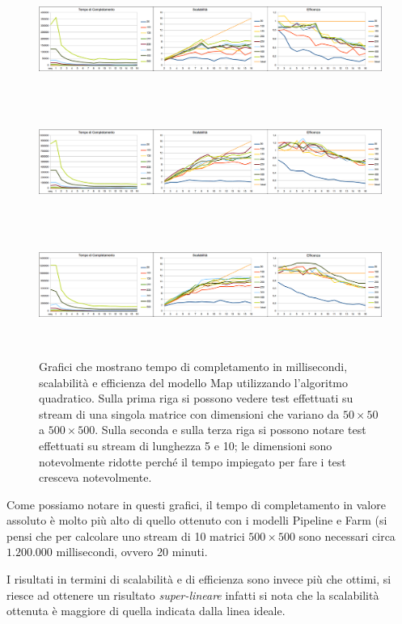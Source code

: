 \documentclass[a4paper,10pt]{article}
\begin{document}
\begin{landscape}
\begin{figure}[ht]
\centering
\includegraphics[height=3.9cm]{plot1quad.png}
\includegraphics[height=3.9cm]{plot5quad.png}
\includegraphics[height=3.9cm]{plot10quad.png}


\caption{\small{Grafici che mostrano tempo di completamento in millisecondi, scalabilit\`a e efficienza del modello \textsf{Map} utilizzando l'algoritmo quadratico. Sulla prima riga si possono vedere test effettuati su stream di una singola matrice con dimensioni che variano da $50 \times 50$ a $500 \times 500$. Sulla seconda e sulla terza riga si possono notare test effettuati su stream di lunghezza 5 e 10; le dimensioni sono notevolmente ridotte perch\'e il tempo impiegato per fare i test cresceva notevolmente.}}
\label{fig:quad}

\end{figure}

\normalsize{Come possiamo notare in questi grafici, il tempo di completamento in valore assoluto \`e molto pi\`u alto di quello ottenuto con i modelli \textsf{Pipeline} e \textsf{Farm} (si pensi che per calcolare uno stream di 10 matrici $500 \times 500$ sono necessari circa $1.200.000$ millisecondi, ovvero 20 minuti.

I risultati in termini di scalabilit\`a e di efficienza sono invece pi\`u che ottimi, si riesce ad ottenere un risultato \emph{super-lineare} infatti si nota che la scalabilit\`a ottenuta \`e maggiore di quella indicata dalla linea ideale.

}
\end{landscape}
\end{document}
